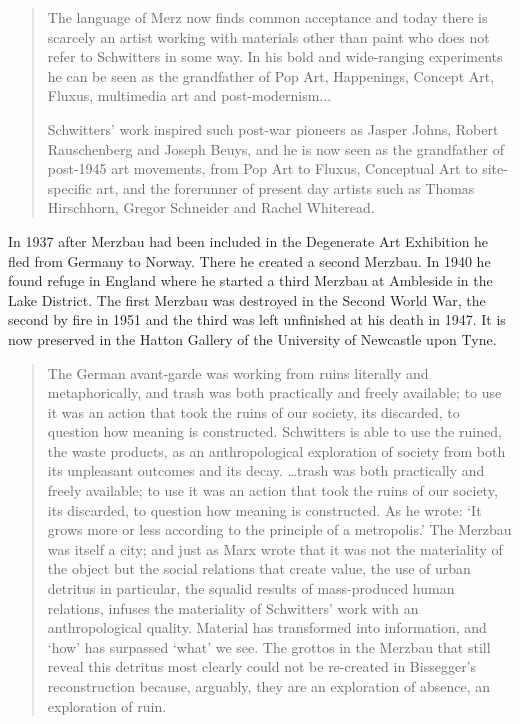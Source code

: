 \begin{quote}
The language of Merz now finds common acceptance and today there is scarcely an artist working with materials other than paint who does not refer to Schwitters in some way. In his bold and wide-ranging experiments he can be seen as the grandfather of Pop Art, Happenings, Concept Art, Fluxus, multimedia art and post-modernism...

Schwitters’ work inspired such post-war pioneers as Jasper Johns, Robert Rauschenberg and Joseph Beuys, and he is now seen as the grandfather of post-1945 art movements, from Pop Art to Fluxus, Conceptual Art to site-specific art, and the forerunner of present day artists such as Thomas Hirschhorn, Gregor Schneider and Rachel Whiteread. \citep{webster2011kurt}
\end{quote}

In 1937 after Merzbau had been included in the Degenerate Art Exhibition he fled from Germany to Norway. There he created a second Merzbau. In 1940 he found refuge in England where he started a third Merzbau at Ambleside in the Lake District. The first Merzbau was destroyed in the Second World War, the second by fire in 1951 and the third was left unfinished at his death in 1947. It is now preserved in the Hatton Gallery of the University of Newcastle upon Tyne.


\begin{quote}
The German avant-garde was working from ruins literally and metaphorically, and trash was both practically and freely available; to use it was an action that took the ruins of our society, its discarded, to question how meaning is constructed. Schwitters is able to use the ruined, the waste products, as an anthropological exploration of society from both its unpleasant outcomes and its decay. \ldots trash was both practically and freely available; to use it was an action that took the ruins of our society, its discarded, to question how meaning is constructed. As he wrote: ‘It grows more or less according to the principle of a metropolis.’ The Merzbau was itself a city; and just as Marx wrote that it was not the materiality of the object but the social relations that create value, the use of urban detritus in particular, the squalid results of mass-produced human relations, infuses the materiality of Schwitters’ work with an anthropological quality. Material has transformed into information, and ‘how’ has surpassed ‘what’ we see. The grottos in the Merzbau that still reveal this detritus most clearly could not be re-created in Bissegger’s reconstruction because, arguably, they are an exploration of absence, an exploration of ruin. \citep{carroll2011ruin}
\end{quote}

